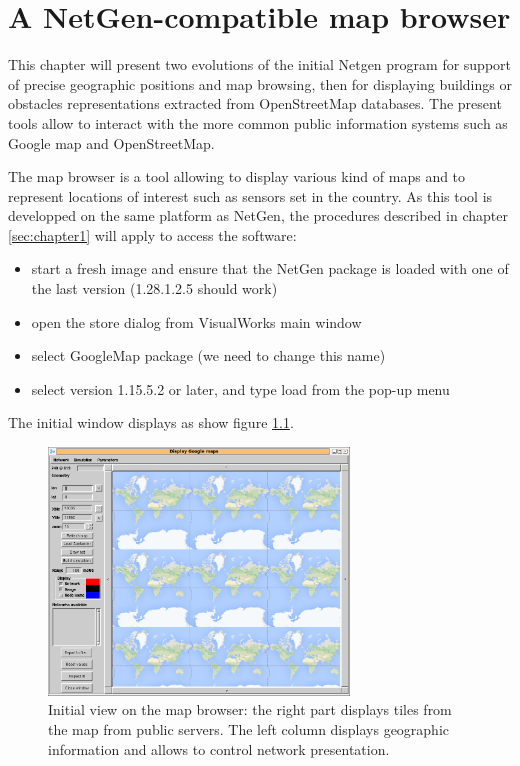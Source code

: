 
\chapter{A NetGen-compatible map browser}

This chapter will present two evolutions of the initial Netgen program for 
support of precise geographic positions and map browsing, then for displaying 
buildings or obstacles representations extracted from OpenStreetMap databases. 
The present tools allow to interact with the more common public information systems 
such as Google map and OpenStreetMap. 

The map browser is a tool allowing to display various kind of maps and to represent 
locations of interest such as sensors set in the country. 
As this tool is developped on the same platform as NetGen, the procedures described 
in chapter \ref{sec:chapter1} will apply to access the software: 
\begin{itemize}
\item start a fresh image and ensure that the NetGen package is loaded with one of the last 
version (1.28.1.2.5 should work)
\item open the store dialog from VisualWorks main window
\item select GoogleMap package (we need to change this name)
\item select version 1.15.5.2 or later, and type load from the pop-up menu
\end{itemize}

The initial window displays as show figure \ref{fig:initialGmap}. 

\begin{figure}
\begin{center} 
\includegraphics[width=8cm]{gmap.png}
\caption{Initial view on the map browser: the right part displays tiles from the map 
from public servers. The left column displays geographic information and allows 
to control network presentation. }
\label{fig:initialGmap}
\end{center}
\end{figure}

